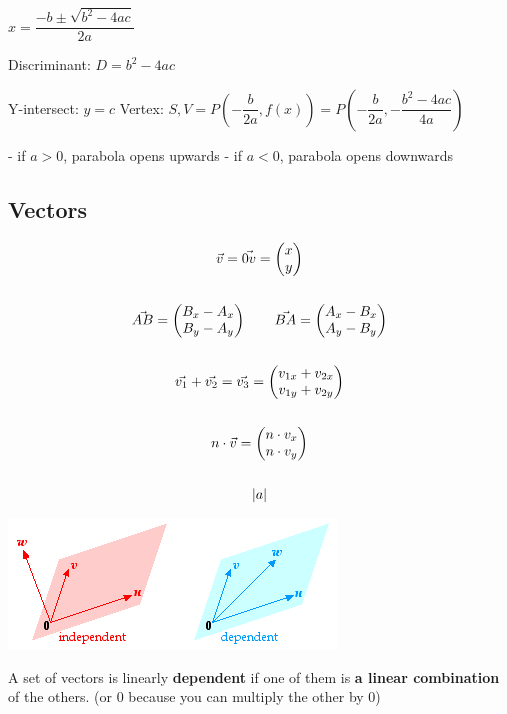 $x = \dfrac{-b\pm\sqrt{b^2-4ac}}{2a}$

Discriminant: $D = b^2-4ac$

Y-intersect: $y = c$
Vertex: $S, V = P\left(-\dfrac{b}{2a}, f(x)\right) = P\left(-\dfrac{b}{2a}, -\dfrac{b^2-4ac}{4a}\right)$

- if $a > 0$, parabola opens upwards
- if $a < 0$, parabola opens downwards

\subsection{Vectors}

\begin{gather*}
\vec{v} = \vec{0v} = \begin{pmatrix} x \\ y \end{pmatrix} \\\\
\vec{AB} = \begin{pmatrix} B_x - A_x \\ B_y - A_y \end{pmatrix} \qquad \vec{BA} = \begin{pmatrix} A_x - B_x \\ A_y - B_y \end{pmatrix}\\\\
\vec{v_1} + \vec{v_2} = \vec{v_3} = \begin{pmatrix} v_{1x} + v_{2x} \\ v_{1y} + v_{2y} \end{pmatrix} \\\\
n\cdot\vec{v}=\begin{pmatrix} n\cdot v_x \\ n\cdot v_y \end{pmatrix} \\\\
\lvert a \rvert
\end{gather*}

\includegraphics{./mathematics/imgs/linear.png}

A set of vectors is linearly \textbf{dependent} if one of them is \textbf{a linear combination} of the others. (or 0 because you can multiply the other by 0)

